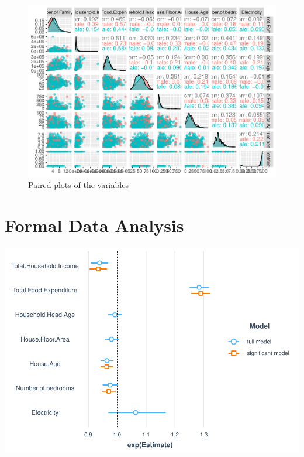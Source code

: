 \documentclass[
]{article}
\begin{document}
\begin{figure}

{\centering \includegraphics[width=1\linewidth]{Group_01_Project2_demo_files/figure-latex/pairs-1} 

}

\caption{Paired plots of the variables}\label{fig:pairs}
\end{figure}

\hypertarget{sec:FDA}{%
\section{Formal Data Analysis}\label{sec:FDA}}

\includegraphics{Group_01_Project2_demo_files/figure-latex/unnamed-chunk-1-1.pdf}
\end{document}
